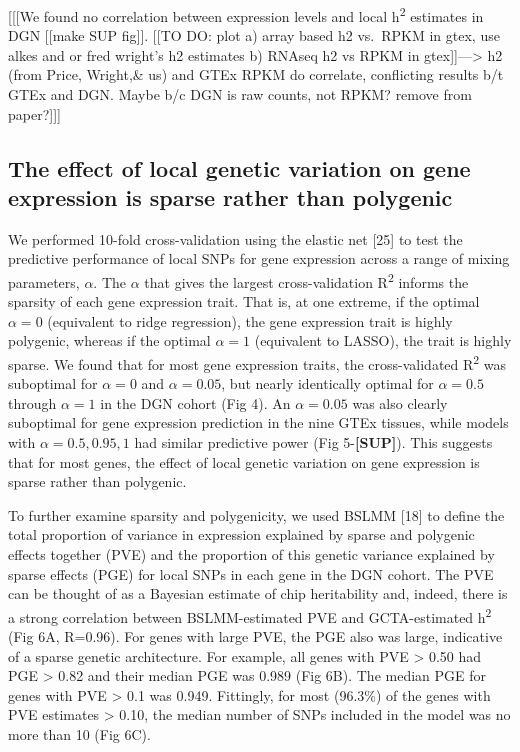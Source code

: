 \documentclass[]{article}
\begin{document}
{[}{[}{[}We found no correlation between expression levels and local
h\textsuperscript{2} estimates in DGN {[}{[}make SUP fig{]}{]}. {[}{[}TO
DO: plot a) array based h2 vs.~RPKM in gtex, use alkes and or fred
wright's h2 estimates b) RNAseq h2 vs RPKM in
gtex{]}{]}---\textgreater{} h2 (from Price, Wright,\& us) and GTEx RPKM
do correlate, conflicting results b/t GTEx and DGN. Maybe b/c DGN is raw
counts, not RPKM? remove from paper?{]}{]}{]}

\subsection{The effect of local genetic variation on gene expression is
sparse rather than
polygenic}\label{the-effect-of-local-genetic-variation-on-gene-expression-is-sparse-rather-than-polygenic}

We performed 10-fold cross-validation using the elastic net {[}25{]} to
test the predictive performance of local SNPs for gene expression across
a range of mixing parameters, \(\alpha\). The \(\alpha\) that gives the
largest cross-validation R\textsuperscript{2} informs the sparsity of
each gene expression trait. That is, at one extreme, if the optimal
\(\alpha=0\) (equivalent to ridge regression), the gene expression trait
is highly polygenic, whereas if the optimal \(\alpha=1\) (equivalent to
LASSO), the trait is highly sparse. We found that for most gene
expression traits, the cross-validated R\textsuperscript{2} was
suboptimal for \(\alpha=0\) and \(\alpha=0.05\), but nearly identically
optimal for \(\alpha=0.5\) through \(\alpha=1\) in the DGN cohort (Fig
4). An \(\alpha=0.05\) was also clearly suboptimal for gene expression
prediction in the nine GTEx tissues, while models with
\(\alpha=0.5,0.95,1\) had similar predictive power (Fig
5-\textbf{{[}SUP{]}}). This suggests that for most genes, the effect of
local genetic variation on gene expression is sparse rather than
polygenic.

To further examine sparsity and polygenicity, we used BSLMM {[}18{]} to
define the total proportion of variance in expression explained by
sparse and polygenic effects together (PVE) and the proportion of this
genetic variance explained by sparse effects (PGE) for local SNPs in
each gene in the DGN cohort. The PVE can be thought of as a Bayesian
estimate of chip heritability and, indeed, there is a strong correlation
between BSLMM-estimated PVE and GCTA-estimated h\textsuperscript{2} (Fig
6A, R=0.96). For genes with large PVE, the PGE also was large,
indicative of a sparse genetic architecture. For example, all genes with
PVE \textgreater{} 0.50 had PGE \textgreater{} 0.82 and their median PGE
was 0.989 (Fig 6B). The median PGE for genes with PVE \textgreater{} 0.1
was 0.949. Fittingly, for most (96.3\%) of the genes with PVE estimates
\textgreater{} 0.10, the median number of SNPs included in the model was
no more than 10 (Fig 6C).
\end{document}
